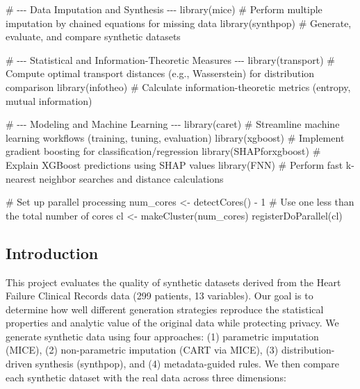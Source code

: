 \documentclass[
  letterpaper,
  DIV=11,
  numbers=noendperiod]{scrartcl}
\newenvironment{Shaded}{\begin{snugshade}}{\end{snugshade}}
\newcommand{\CommentTok}[1]{\textcolor[rgb]{0.37,0.37,0.37}{#1}}
\newcommand{\DecValTok}[1]{\textcolor[rgb]{0.68,0.00,0.00}{#1}}
\newcommand{\FunctionTok}[1]{\textcolor[rgb]{0.28,0.35,0.67}{#1}}
\newcommand{\NormalTok}[1]{\textcolor[rgb]{0.00,0.23,0.31}{#1}}
\newcommand{\OtherTok}[1]{\textcolor[rgb]{0.00,0.23,0.31}{#1}}
\newcommand{\SpecialCharTok}[1]{\textcolor[rgb]{0.37,0.37,0.37}{#1}}
\begin{document}
\begin{Shaded}
\begin{Highlighting}[]
\CommentTok{\# {-}{-}{-} Data Imputation and Synthesis {-}{-}{-}}
\FunctionTok{library}\NormalTok{(mice)                 }\CommentTok{\# Perform multiple imputation by chained equations for missing data}
\FunctionTok{library}\NormalTok{(synthpop)             }\CommentTok{\# Generate, evaluate, and compare synthetic datasets}

\CommentTok{\# {-}{-}{-} Statistical and Information{-}Theoretic Measures {-}{-}{-}}
\FunctionTok{library}\NormalTok{(transport)            }\CommentTok{\# Compute optimal transport distances (e.g., Wasserstein) for distribution comparison}
\FunctionTok{library}\NormalTok{(infotheo)             }\CommentTok{\# Calculate information{-}theoretic metrics (entropy, mutual information)}

\CommentTok{\# {-}{-}{-} Modeling and Machine Learning {-}{-}{-}}
\FunctionTok{library}\NormalTok{(caret)                }\CommentTok{\# Streamline machine learning workflows (training, tuning, evaluation)}
\FunctionTok{library}\NormalTok{(xgboost)              }\CommentTok{\# Implement gradient boosting for classification/regression}
\FunctionTok{library}\NormalTok{(SHAPforxgboost)       }\CommentTok{\# Explain XGBoost predictions using SHAP values}
\FunctionTok{library}\NormalTok{(FNN)                  }\CommentTok{\# Perform fast k{-}nearest neighbor searches and distance calculations}

\CommentTok{\# Set up parallel processing}
\NormalTok{num\_cores }\OtherTok{\textless{}{-}} \FunctionTok{detectCores}\NormalTok{() }\SpecialCharTok{{-}} \DecValTok{1}  \CommentTok{\# Use one less than the total number of cores}
\NormalTok{cl }\OtherTok{\textless{}{-}} \FunctionTok{makeCluster}\NormalTok{(num\_cores)}
\FunctionTok{registerDoParallel}\NormalTok{(cl)}
\end{Highlighting}
\end{Shaded}

\newpage

\subsection{Introduction}\label{introduction}

This project evaluates the quality of synthetic datasets derived from
the Heart Failure Clinical Records data (299 patients, 13 variables).
Our goal is to determine how well different generation strategies
reproduce the statistical properties and analytic value of the original
data while protecting privacy. We generate synthetic data using four
approaches: (1) parametric imputation (MICE), (2) non-parametric
imputation (CART via MICE), (3) distribution-driven synthesis
(synthpop), and (4) metadata-guided rules. We then compare each
synthetic dataset with the real data across three dimensions:
\end{document}
